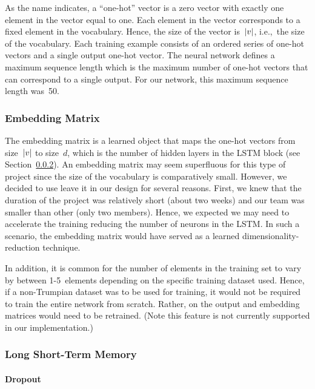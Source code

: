 \documentclass{article}
\DeclarePairedDelimiter\abs{\lvert}{\rvert}%
\begin{document}
As the name indicates, a ``one-hot'' vector is a zero vector with exactly one element in the vector equal to one.  Each element in the vector corresponds to a fixed element in the vocabulary.  Hence, the size of the vector is~$\abs*{v}$, i.e.,~the size of the vocabulary. Each training example consists of an ordered series of one-hot vectors and a single output one-hot vector.  The neural network defines a maximum sequence length which is the maximum number of one-hot vectors that can correspond to a single output.  For our network, this maximum sequence length was~50.

\subsubsection{Embedding Matrix}

The embedding matrix is a learned object that maps the one-hot vectors from size~$\abs*{v}$ to size~$d$, which is the number of hidden layers in the LSTM block (see Section~\ref{sec:lstm}).  An embedding matrix may seem superfluous for this type of project since the size of the vocabulary is comparatively small.  However, we decided to use leave it in our design for several reasons.  First, we knew that the duration of the project was relatively short (about two weeks) and our team was smaller than other (only two members).  Hence, we expected we may need to accelerate the training reducing the number of neurons in the LSTM.  In such a scenario, the embedding matrix would have served as a learned dimensionality-reduction technique.  

In addition, it is common for the number of elements in the training set to vary by between 1-5~elements depending on the specific training dataset used.  Hence, if a non-Trumpian dataset was to be used for training, it would not be required to train the entire network from scratch.  Rather, on the output and embedding matrices would need to be retrained. (Note this feature is not currently supported in our implementation.)


\subsubsection{Long Short-Term Memory}\label{sec:lstm}


\paragraph{Dropout}\label{sec:dropout}
\end{document}
